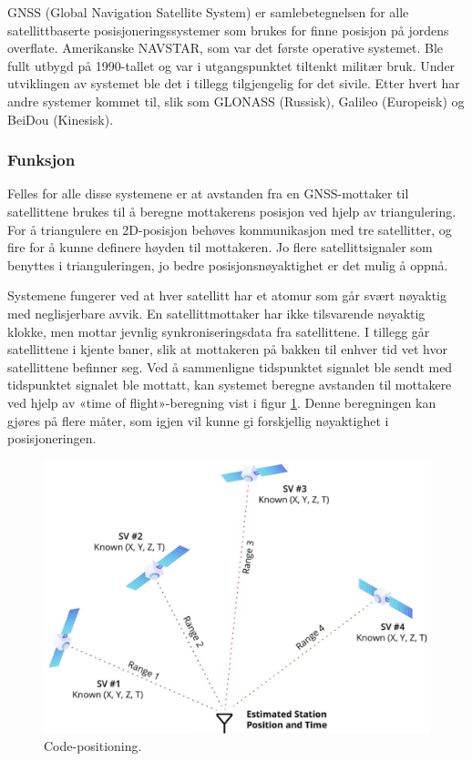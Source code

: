 GNSS (Global Navigation Satellite System) er samlebetegnelsen for alle satellittbaserte posisjoneringssystemer som brukes for finne posisjon på 
jordens overflate. Amerikanske NAVSTAR, som var det første operative systemet. Ble fullt utbygd på 1990-tallet og 
var i utgangspunktet tiltenkt militær bruk. Under utviklingen av systemet ble det i tillegg tilgjengelig for det sivile. 
Etter hvert har andre systemer kommet til, slik som GLONASS (Russisk), Galileo (Europeisk) og BeiDou (Kinesisk). \parencite{ForsellGNSS}

\subsubsection{Funksjon}

Felles for alle disse systemene er at avstanden fra en GNSS-mottaker til satellittene brukes til å beregne mottakerens posisjon 
ved hjelp av triangulering. For å triangulere en 2D-posisjon behøves kommunikasjon med tre satellitter, og fire for å kunne definere 
høyden til mottakeren. Jo flere satellittsignaler som benyttes i trianguleringen, jo bedre posisjonsnøyaktighet er det mulig å oppnå. 
\parencite{NorskRomsenter}

Systemene fungerer ved at hver satellitt har et atomur som går svært nøyaktig med neglisjerbare avvik. 
En satellittmottaker har ikke tilsvarende nøyaktig klokke, men mottar jevnlig synkroniseringsdata fra satellittene. 
I tillegg går satellittene i kjente baner, slik at mottakeren på bakken til enhver tid vet hvor satellittene befinner seg. 
Ved å sammenligne tidspunktet signalet ble sendt med tidspunktet signalet ble mottatt, 
kan systemet beregne avstanden til mottakere ved hjelp av «time of flight»-beregning vist i figur \ref{fig:code-positioning}. 
Denne beregningen kan gjøres på flere måter, som igjen vil kunne gi forskjellig nøyaktighet i posisjoneringen. \parencite{ForsellGNSS} 

\begin{figure}[htp]
    \centering
    \includegraphics[width=1\columnwidth]{figures/code-positioning}
    \caption{Code-positioning. \parencite{Tallysman}}
    \label{fig:code-positioning}
\end{figure}

